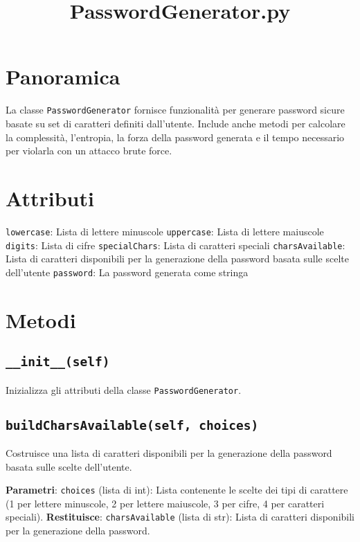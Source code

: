 \documentclass{article}
\title{PasswordGenerator.py}
\author{}
\date{}
\begin{document}
    
    \maketitle

    \section*{Panoramica}
        La classe \texttt{PasswordGenerator} fornisce funzionalità per generare password sicure basate su set di caratteri definiti dall'utente. Include anche metodi per calcolare la complessità, l'entropia, la forza della password generata e il tempo necessario per violarla con un attacco brute force.

    \section*{Attributi}
        \begin{outline}
            \1 \texttt{lowercase}: Lista di lettere minuscole
            \1 \texttt{uppercase}: Lista di lettere maiuscole
            \1 \texttt{digits}: Lista di cifre
            \1 \texttt{specialChars}: Lista di caratteri speciali
            \1 \texttt{charsAvailable}: Lista di caratteri disponibili per la generazione della password basata sulle scelte dell'utente
            \1 \texttt{password}: La password generata come stringa
        \end{outline}

    \section*{Metodi}
        \subsection*{\texttt{\_\_init\_\_(self)}}
            Inizializza gli attributi della classe \texttt{PasswordGenerator}.
        
        \subsection*{\texttt{buildCharsAvailable(self, choices)}}
            Costruisce una lista di caratteri disponibili per la generazione della password basata sulle scelte dell'utente.
            \begin{outline}
                \1 \textbf{Parametri}:
                    \2 \texttt{choices} (lista di int): Lista contenente le scelte dei tipi di carattere (1 per lettere minuscole, 2 per lettere maiuscole, 3 per cifre, 4 per caratteri speciali).
                \1 \textbf{Restituisce}:
                    \2 \texttt{charsAvailable} (lista di str): Lista di caratteri disponibili per la generazione della password.
            \end{outline}
        
\end{document}
